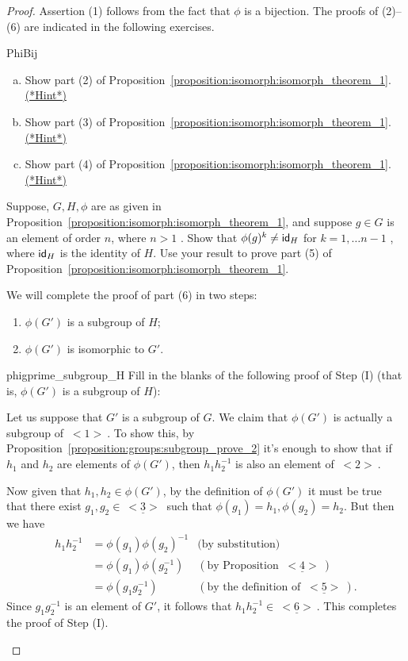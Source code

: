 \begin{proof}
Assertion (1) follows from the fact that $\phi$ is a bijection.  The proofs of (2)--(6) are indicated in the following exercises.

\begin{exercise}{PhiBij}
\begin{enumerate}[(a)]
\item 
Show part (2) of Proposition~\ref{proposition:isomorph:isomorph_theorem_1}.
\hyperref[sec:isomorph:hints]{(*Hint*)}
\item
Show part (3) of Proposition~\ref{proposition:isomorph:isomorph_theorem_1}.
\hyperref[sec:isomorph:hints]{(*Hint*)}
\item
Show part (4) of Proposition~\ref{proposition:isomorph:isomorph_theorem_1}.
\hyperref[sec:isomorph:hints]{(*Hint*)}
\end{enumerate}
\end{exercise} 

\begin{exercise}{}
Suppose, $G, H, \phi$ are as given  in Proposition~\ref{proposition:isomorph:isomorph_theorem_1}, and suppose $g \in G$ is an element of order $n$, where $n>1$ . Show that 
$\phi(g)^k \neq {\sf{i}d}_H$ for $k=1,\ldots n-1$ , where ${\sf{i}d}_H$ is the identity of $H$.  Use your result to prove part (5) of  Proposition~\ref{proposition:isomorph:isomorph_theorem_1}.
\end{exercise}

\noindent
We will complete the proof of part (6) in two steps:
\begin{enumerate}[Step (I):~~]
\item
$\phi(G')$ is a subgroup of $H$;
\item
$\phi(G')$ is isomorphic to $G'$.
\end{enumerate}

\begin{exercise}{phigprime_subgroup_H} Fill in the blanks of the following proof of Step (I)  (that is, $\phi(G')$ is a subgroup of $H$):
\medskip

Let us suppose that $G'$ is a subgroup of $G$. We claim that $\phi(G')$ is actually a subgroup of \underline{$~<1>~$}.  To show this, by Proposition~\ref{proposition:groups:subgroup_prove_2} it's enough to show that if $h_1$ and $h_2$ are elements of  $\phi(G')$, then $h_1 h_2^{-1}$ is also an element of \underline{$~<2>~$}.

Now given that  $h_1, h_2 \in \phi(G')$, by the definition of $\phi(G')$ it must be true that there exist $g_1, g_2 \in \underline{~<3>~}$ such that $\phi(g_1) = h_1, \phi(g_2) = h_2$. But then we have 
\begin{align*}
h_1 h_2^{-1} &= \phi(g_1) \phi(g_2)^{-1} &\text{(by substitution)}\\
&= \phi(g_1) \phi(g_2^{-1}) &(\text{by Proposition~}\underline{~<4>~})\\
&= \phi(g_1 g_2^{-1}) &(\text{by the definition of }\underline{~<5>~}).
\end{align*}
Since $g_1 g_2^{-1}$ is an element of $G'$, it follows that $h_1 h_2^{-1} \in \underline{~<6>~}$. This completes the proof of Step (I).
\end{exercise}


\end{proof}
